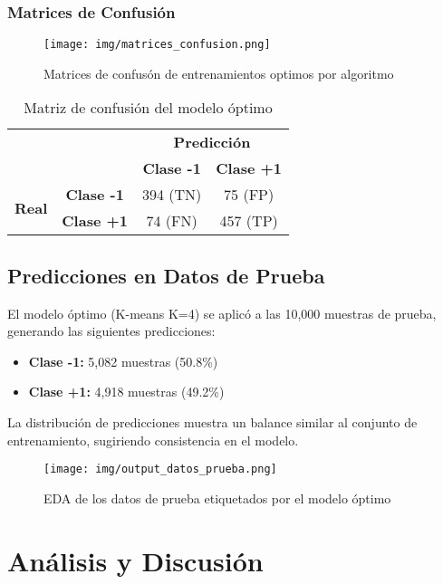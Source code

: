 \documentclass[12pt,a4paper]{article}
\begin{document}
\subsubsection{Matrices de Confusión}

\begin{figure}[H]
    \centering
    \texttt{[image: img/matrices\_confusion.png]}
    \caption{Matrices de confusón de entrenamientos optimos por algoritmo}
\end{figure}

\begin{table}[H]
\centering
\caption{Matriz de confusión del modelo óptimo}
\begin{tabular}{cc|cc}
\multicolumn{2}{c}{} & \multicolumn{2}{c}{\textbf{Predicción}} \\
\multicolumn{2}{c|}{} & \textbf{Clase -1} & \textbf{Clase +1} \\
\hline
\multirow{2}{*}{\textbf{Real}} & \textbf{Clase -1} & 394 (TN) & 75 (FP) \\
& \textbf{Clase +1} & 74 (FN) & 457 (TP) \\
\end{tabular}
\end{table}

\subsection{Predicciones en Datos de Prueba}

El modelo óptimo (K-means K=4) se aplicó a las 10,000 muestras de prueba, generando las siguientes predicciones:
\begin{itemize}
    \item \textbf{Clase -1:} 5,082 muestras (50.8\%)
    \item \textbf{Clase +1:} 4,918 muestras (49.2\%)
\end{itemize}

La distribución de predicciones muestra un balance similar al conjunto de entrenamiento, sugiriendo consistencia en el modelo.

\begin{figure}[H]
    \centering
    \texttt{[image: img/output\_datos\_prueba.png]}
    \caption{EDA de los datos de prueba etiquetados por el modelo óptimo}
\end{figure}

\section{Análisis y Discusión}
\end{document}
